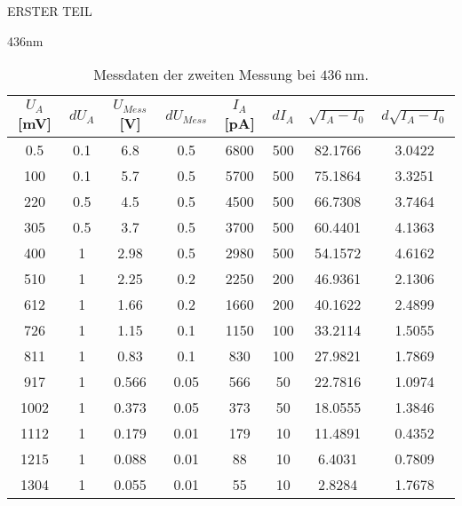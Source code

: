 \begin{appendix}
\begin{chapter}{ERSTER TEIL}
\begin{section}{436nm}
        \begin{table}[htbp]
          \centering
          \scriptsize
          \begin{tabular}{|c|c|c|c|c|c|c|c|}
            \hline
            $U_{A}$ [mV] & $dU_{A}$ & $U_{Mess}$ [V] & $dU_{Mess}$ & 
                $I_{A}$ [pA] & $dI_{A}$ & $\sqrt{I_{A}-I_0}$ & 
                $d\sqrt{I_{A}-I_0}$ \\ \hline
            0.5 & 0.1 & 6.8 & 0.5 & 6800 & 500 & 82.1766 & 3.0422 \\ \hline
          100 & 0.1 & 5.7 & 0.5 & 5700 & 500 & 75.1864 & 3.3251 \\ \hline
          220 & 0.5 & 4.5 & 0.5 & 4500 & 500 & 66.7308 & 3.7464 \\ \hline
          305 & 0.5 & 3.7 & 0.5 & 3700 & 500 & 60.4401 & 4.1363 \\ \hline
          400 & 1 & 2.98 & 0.5 & 2980 & 500 & 54.1572 & 4.6162 \\ \hline
          510 & 1 & 2.25 & 0.2 & 2250 & 200 & 46.9361 & 2.1306 \\ \hline
          612 & 1 & 1.66 & 0.2 & 1660 & 200 & 40.1622 & 2.4899 \\ \hline
          726 & 1 & 1.15 & 0.1 & 1150 & 100 & 33.2114 & 1.5055 \\ \hline
          811 & 1 & 0.83 & 0.1 & 830 & 100 & 27.9821 & 1.7869 \\ \hline
          917 & 1 & 0.566 & 0.05 & 566 & 50 & 22.7816 & 1.0974 \\ \hline
          1002 & 1 & 0.373 & 0.05 & 373 & 50 & 18.0555 & 1.3846 \\ \hline
          1112 & 1 & 0.179 & 0.01 & 179 & 10 & 11.4891 & 0.4352 \\ \hline
          1215 & 1 & 0.088 & 0.01 & 88 & 10 & 6.4031 & 0.7809 \\ \hline
          1304 & 1 & 0.055 & 0.01 & 55 & 10 & 2.8284 & 1.7678 \\ \hline
\hline
          \end{tabular}
          \caption{Messdaten der zweiten Messung bei $\SI{436}{\nano\meter}$.}
          \label{tab:436_2}
        \end{table}
        

\end{section}
\end{chapter}
\end{appendix}
